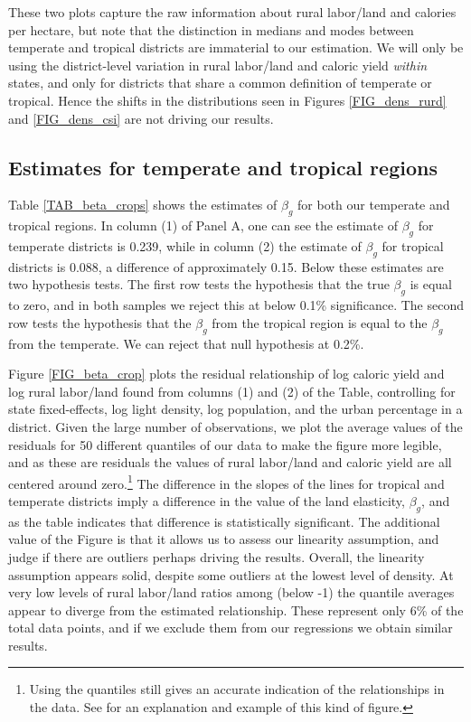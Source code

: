 \documentclass[11pt]{article}
\begin{document}
These two plots capture the raw information about rural labor/land and calories per hectare, but note that the distinction in medians and modes between temperate and tropical districts are immaterial to our estimation. We will only be using the district-level variation in rural labor/land and caloric yield \textit{within} states, and only for districts that share a common definition of temperate or tropical. Hence the shifts in the distributions seen in Figures \ref{FIG_dens_rurd} and \ref{FIG_dens_csi} are not driving our results. 

\subsection{Estimates for temperate and tropical regions}
Table \ref{TAB_beta_crops} shows the estimates of $\beta_g$ for both our temperate and tropical regions. In column (1) of Panel A, one can see the estimate of $\beta_g$ for temperate districts is 0.239, while in column (2) the estimate of $\beta_g$ for tropical districts is 0.088, a difference of approximately 0.15. Below these estimates are two hypothesis tests. The first row tests the hypothesis that the true $\beta_g$ is equal to zero, and in both samples we reject this at below 0.1\% significance. The second row tests the hypothesis that the $\beta_g$ from the tropical region is equal to the $\beta_g$ from the temperate. We can reject that null hypothesis at 0.2\%.

Figure \ref{FIG_beta_crop} plots the residual relationship of log caloric yield and log rural labor/land found from columns (1) and (2) of the Table, controlling for state fixed-effects, log light density, log population, and the urban percentage in a district. Given the large number of observations, we plot the average values of the residuals for 50 different quantiles of our data to make the figure more legible, and as these are residuals the values of rural labor/land and caloric yield are all centered around zero.\footnote{Using the quantiles still gives an accurate indication of the relationships in the data. See \citet{cfs2013} for an explanation and example of this kind of figure.} The difference in the slopes of the lines for tropical and temperate districts imply a difference in the value of the land elasticity, $\beta_g$, and as the table indicates that difference is statistically significant. The additional value of the Figure is that it allows us to assess our linearity assumption, and judge if there are outliers perhaps driving the results. Overall, the linearity assumption appears solid, despite some outliers at the lowest level of density. At very low levels of rural labor/land ratios among (below -1) the quantile averages appear to diverge from the estimated relationship. These represent only 6\% of the total data points, and if we exclude them from our regressions we obtain similar results.
\end{document}
